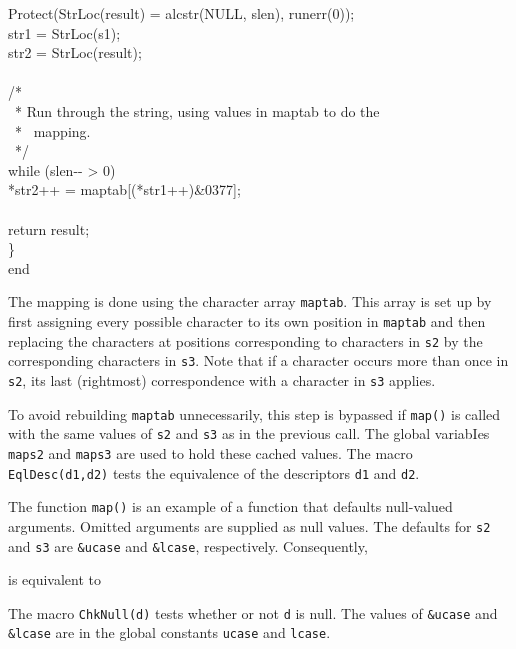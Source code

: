 {\>\>\>Protect(StrLoc(result) = alcstr(NULL, slen), runerr(0));\\
\>\>\>str1 = StrLoc(s1);\\
\>\>\>str2 = StrLoc(result);\\
\\
\>\>\>/*\\
\>\>\>\ * Run through the string, using values in maptab to do the\\
\>\>\>\ * \ mapping.\\
\>\>\>\ */\\
\>\>\>while (slen-{}- > 0)\\
\>\>\>\>*str2++ = maptab[(*str1++)\&0377];\\
\\
\>\>\>return result;\\
\>\>\}\\
end
}

The mapping is done using the character array \texttt{maptab}. This
array is set up by first assigning every possible character to its own
position in \texttt{maptab} and then replacing the characters at
positions corresponding to characters in \texttt{s2} by the
corresponding characters in \texttt{s3}. Note that if a character
occurs more than once in \texttt{s2}, its last (rightmost)
correspondence with a character in \texttt{s3} applies.

To avoid rebuilding \texttt{maptab} unnecessarily, this step is
bypassed if \texttt{map()} is called with the same values of
\texttt{s2} and \texttt{s3} as in the previous call. The global
variabIes \texttt{maps2} and \texttt{maps3} are used to hold these
{\textquotedbl}cached{\textquotedbl} values. The macro
\texttt{EqlDesc(d1,d2)} tests the equivalence of the descriptors
\texttt{d1} and \texttt{d2}.

The function \texttt{map()} is an example of a function that defaults
null-valued arguments. Omitted arguments are supplied as null
values. The defaults for \texttt{s2} and \texttt{s3} are
\texttt{\&ucase} and \texttt{\&lcase}, respectively. Consequently,


\noindent
is equivalent to


The macro \texttt{ChkNull(d)} tests whether or not \texttt{d} is
null. The values of \texttt{\&ucase} and \texttt{\&lcase} are in the
global constants \texttt{ucase} and \texttt{lcase}.

